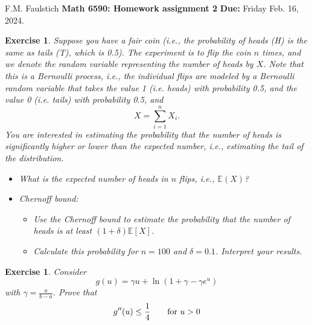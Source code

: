 \documentclass[11pt]{article}
\newtheorem{exercise}[theorem]{Exercise}
\begin{document}
\begin{flushleft}
F.M. Faulstich \hfill {\large\bf Math 6590: Homework assignment 2} \hfill {\bf Due:} Friday Feb. 16, 2024.\\
\end{flushleft}


\begin{exercise}
Suppose you have a fair coin (i.e., the probability of heads (H) is the same as tails (T), which is 0.5). The experiment is to flip the coin $n$ times, and we denote the random variable representing the number of heads by $X$. Note that this is a Bernoulli process, i.e., the individual flips are modeled by a Bernoulli random variable that takes the value 1 (i.e. heads) with probability 0.5, and the value 0 (i.e. tails) with probability 0.5, and 
$$
X = \sum_{i=1}^n X_i.
$$
You are interested in estimating the probability that the number of heads is significantly higher or lower than the expected number, i.e., estimating the tail of the distribution.
\begin{itemize}
    \item[a)] What is the expected number of heads in $n$ flips, i.e., $\mathbb{E}(X)$?
    \item[b)] Chernoff bound:
    \begin{itemize}
        \item[i)] Use the Chernoff bound to estimate the probability that the number of heads is at least $(1 + \delta)\mathbb{E}[X]$.
    \item[ii)] Calculate this probability for $n = 100$ and $\delta = 0.1$. Interpret your results.
    \end{itemize}
    
\end{itemize}

\end{exercise}

\begin{exercise}
Consider 
$$
g(u)
=
\gamma u + \ln \left(1 + \gamma - \gamma e^{u}\right)
$$
with $\gamma = \frac{a}{b-a}$.
Prove that 
$$
g''(u) \leq \frac{1}{4}\qquad {\rm for~} u>0
$$
\end{exercise}
\end{document}
